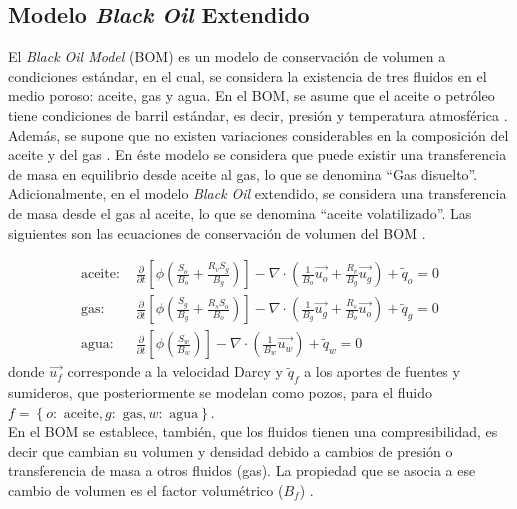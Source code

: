 \subsection[Modelo \emph{Black Oil} Extendido]{Modelo {\normalfont \bfseries \itshape Black Oil} Extendido}

El \textit{Black Oil Model} (BOM) es un modelo de conservación de volumen a condiciones estándar, en el cual, se considera la existencia de tres fluidos en el medio poroso: aceite, gas y agua. En el BOM, se asume que el aceite o petróleo tiene condiciones de barril estándar, es decir, presión y temperatura atmosférica \citep{chen2007reservoir}. Además, se supone que no existen variaciones considerables en la composición del aceite y del gas \citep{jamal2006petroleum, chen2007reservoir, ertekin2001basic}. En éste modelo se considera que puede existir una transferencia de masa en equilibrio desde aceite al gas, lo que se denomina ``Gas disuelto''. Adicionalmente, en el modelo \textit{Black Oil} extendido, se considera una transferencia de masa desde el gas al aceite, lo que se denomina ``aceite volatilizado''. Las siguientes son las ecuaciones de conservación de volumen del BOM \citep{jamal2006petroleum, chen2007reservoir, ertekin2001basic}.

\begin{align}
\label{ec:aceite}
\text{aceite: }&\frac{\partial}{\partial t} \left[ \phi \left( \frac{S_{o}}{B_{o}} + \frac{R_{v} S_{g}}{B_{g}} \right) \right]
- \nabla \cdot \left( \frac{1}{B_{o}} \vec{u_{o}} + \frac{R_{v}}{B_{g}} \vec{u_{g}} \right) + \tilde{q}_{o}=0  \\
\label{ec:gas}
\text{gas: }&\frac{\partial}{\partial t} \left[ \phi \left( \frac{S_{g}}{B_{g}} + \frac{R_{s} S_{o}}{B_{o}} \right) \right]
- \nabla \cdot \left( \frac{1}{B_{g}} \vec{u_{g}} + \frac{R_{s}}{B_{o}} \vec{u_{o}} \right) + \tilde{q}_{g} = 0 \\
\label{ec:agua}
\text{agua: }&\frac{\partial}{\partial t} \left[\phi \left( \frac{S_{w}}{B_{w}} \right) \right] - \nabla \cdot \left( \frac{1}{B_{w}} \vec{u_{w}} \right) + \tilde{q}_{w} = 0 
\end{align}
donde $\vec{u_{f}}$ corresponde a la velocidad Darcy y $\tilde{q}_{f}$ a los aportes de fuentes y sumideros, que posteriormente se modelan como pozos, para el fluido $f = \left\lbrace o:\text{ aceite}, g:\text{ gas}, w:\text{ agua} \right\rbrace $.\\

En el BOM se establece, también, que los fluidos tienen una compresibilidad, es decir que cambian su volumen y densidad debido a cambios de presión o transferencia de masa a otros fluidos (gas). La propiedad que se asocia a ese cambio de volumen es el factor volumétrico ($B_{f}$) \citep{chen2007reservoir}.\\


